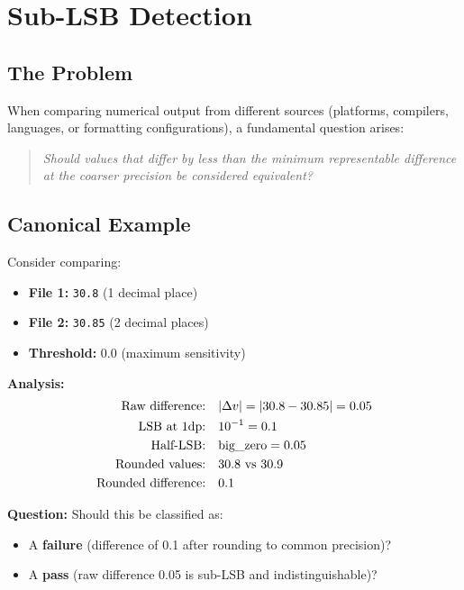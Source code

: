 \section{Sub-LSB Detection}
\label{sec:sublsb}

\subsection{The Problem}

When comparing numerical output from different sources (platforms, compilers, languages, or formatting configurations), a fundamental question arises:

\begin{quote}
\emph{Should values that differ by less than the minimum representable difference at the coarser precision be considered equivalent?}
\end{quote}

\subsection{Canonical Example}

Consider comparing:
\begin{itemize}
    \item \textbf{File 1:} \texttt{30.8} (1 decimal place)
    \item \textbf{File 2:} \texttt{30.85} (2 decimal places)
    \item \textbf{Threshold:} 0.0 (maximum sensitivity)
\end{itemize}

\textbf{Analysis:}
\begin{align*}
    \text{Raw difference:} \quad & |\Delta v| = |30.8 - 30.85| = 0.05 \\
    \mathrm{LSB} \text{ at 1dp:} \quad & 10^{-1} = 0.1 \\
    \text{Half-LSB:} \quad & \text{big\_zero} = 0.05 \\
    \text{Rounded values:} \quad & 30.8 \text{ vs } 30.9 \\
    \text{Rounded difference:} \quad & 0.1
\end{align*}

\textbf{Question:} Should this be classified as:
\begin{itemize}
    \item A \textbf{failure} (difference of 0.1 after rounding to common precision)?
    \item A \textbf{pass} (raw difference 0.05 is sub-LSB and indistinguishable)?
\end{itemize}

